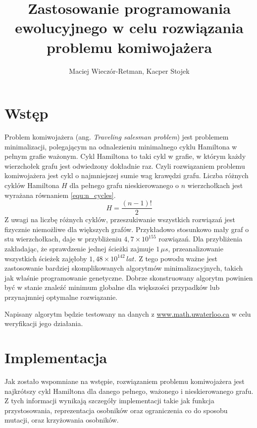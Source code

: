 \documentclass[11pt]{article}
\title{Zastosowanie programowania ewolucyjnego w celu rozwiązania problemu
    komiwojażera}
\author{Maciej Wieczór-Retman, Kacper Stojek}
\date{} %
\begin{document}
\maketitle

\section{Wstęp}

Problem komiwojażera (ang. \textit{Traveling salesman problem}) jest problemem
minimalizacji, polegającym na odnalezieniu minimalnego cyklu Hamiltona w pełnym
grafie ważonym. Cykl Hamiltona to taki cykl w grafie, w którym każdy wierzchołek
grafu jest odwiedzony dokładnie raz. Czyli rozwiązaniem problemu komiwojażera
jest cykl o najmniejszej sumie wag krawędzi grafu. Liczba różnych cyklów
Hamiltona $H$ dla pełnego grafu nieskierowanego o $n$ wierzchołkach jest
wyrażana równaniem \cref{equ:n_cycles}.
\begin{equation}
    H = \frac{\left(n - 1\right)!}{2}
    \label{equ:n_cycles}
\end{equation}
Z uwagi na liczbę różnych cyklów, przeszukiwanie wszystkich rozwiązań jest
fizycznie niemożliwe dla większych grafów. Przykładowo stosunkowo mały graf o
stu wierzchołkach, daje w przybliżeniu $4,7 \times  10^{155}$ rozwiązań. Dla
przybliżenia zakładając, że sprawdzenie jednej ścieżki zajmuje $1 \, \mu s$,
przeanalizowanie wszystkich ścieżek zajęłoby $1,48 \times  10^{142} \, lat$.
Z tego powodu ważne jest zastosowanie bardziej skomplikowanych algorytmów
minimalizacyjnych, takich jak właśnie programowanie genetyczne. Dobrze
skonstruowany algorytm powinien być w stanie znaleźć minimum globalne dla
większości przypadków lub przynajmniej optymalne rozwiązanie.

Napisany algorytm będzie testowany na danych z
{\color{blue} \href{https://www.math.uwaterloo.ca/tsp/vlsi/index.html}
{www.math.uwaterloo.ca}} w celu weryfikacji jego działania.

\section{Implementacja}

Jak zostało wspomniane na wstępie, rozwiązaniem problemu komiwojażera jest
najkrótszy cykl Hamiltona dla danego pełnego, ważonego i nieskierowanego grafu.
Z tych informacji wynikają szczegóły implementacji takie jak funkcja
przystosowania, reprezentacja osobników oraz ograniczenia co do sposobu mutacji,
oraz krzyżowania osobników.
\end{document}
